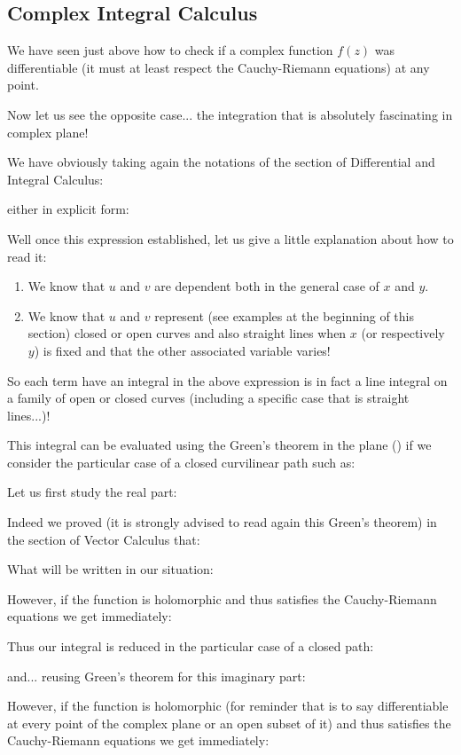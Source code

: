 	\subsection{Complex Integral Calculus}
	We have seen just above how to check if a complex function $f (z)$ was differentiable (it must at least respect the Cauchy-Riemann equations) at any point.
	
	Now let us see the opposite case... the integration that is absolutely fascinating in complex plane!
	
	We have obviously taking again the notations of the section of Differential and Integral Calculus:
	
	either in explicit form:
	
	Well once this expression established, let us give a little explanation about how to read it:
	\begin{enumerate}
		\item We know that $u$ and $v$ are dependent both in the general case of $x$ and $y$.
		
		\item We know that $ u $ and $ v $ represent (see examples at the beginning of this section) closed or open curves and also straight lines when $ x $ (or respectively $y$) is fixed and that the other associated variable varies!
	\end{enumerate}
	So each term have an integral in the above expression is in fact a line integral on a family of open or closed curves (including a specific case that is straight lines...)!
	
	This integral can be evaluated using the Green's theorem in the plane () if we consider the particular case of a closed curvilinear path such as:
	
	Let us first study the real part:
	
	Indeed we proved (it is strongly advised to read again this Green's theorem) in the section of Vector Calculus that:
	
	What will be written in our situation:
	
	However, if the function is holomorphic and thus satisfies the Cauchy-Riemann equations we get immediately:
	
	Thus our integral is reduced in the particular case of a closed path:
	
	and... reusing Green's theorem for this imaginary part:
	
	However, if the function is holomorphic (for reminder that is to say differentiable at every point of the complex plane or an open subset of it) and thus satisfies the Cauchy-Riemann equations we get immediately:
	
